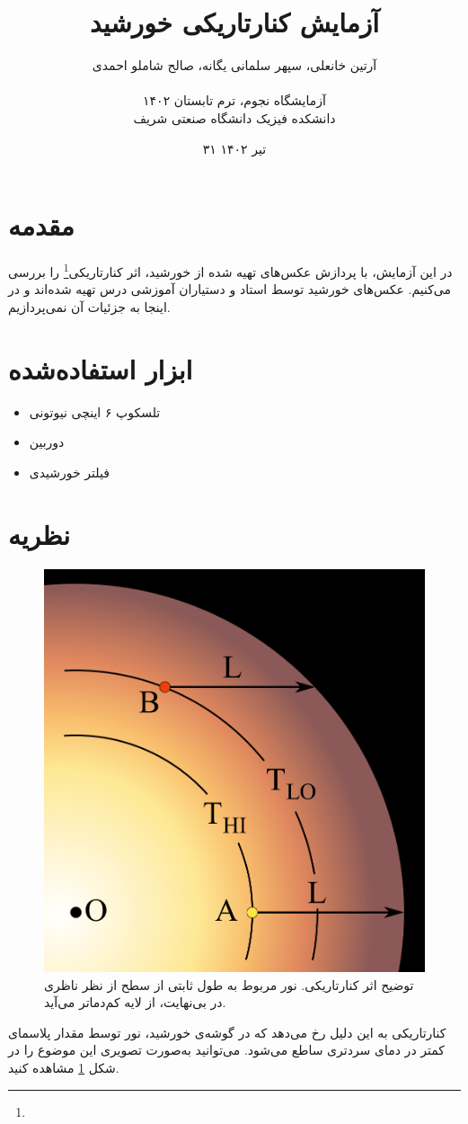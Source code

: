 \documentclass[12pt,a4paper]{article}
\title{آزمایش کنارتاریکی خورشید}
\author{آرتین خانعلی، سپهر سلمانی یگانه، صالح شاملو احمدی\\\\
	آزمایشگاه نجوم، ترم تابستان ۱۴۰۲\\دانشکده فیزیک دانشگاه صنعتی شریف}
\date{۳۱ تیر ۱۴۰۲}
\begin{document}
	\maketitle
	\twocolumnfootnotes
	\section{مقدمه}
	در این آزمایش، با پردازش عکس‌های تهیه شده از خورشید، اثر کنارتاریکی\footnote{} را بررسی می‌کنیم.
	عکس‌های خورشید توسط استاد و دستیاران آموزشی درس تهیه شده‌اند و در اینجا به جزئیات آن نمی‌پردازیم.
	\section{ابزار استفاده‌شده}
	\begin{itemize}
		\item تلسکوپ ۶ اینچی نیوتونی
		\item دوربین 
		\item فیلتر خورشیدی
	\end{itemize}
	\section{نظریه}
	\begin{figure}
		\centering
		\includegraphics[width=\linewidth]{../fig/Limb_darkening_layers.pdf}
		\caption{توضیح اثر کنارتاریکی. نور مربوط به طول ثابتی از سطح از نظر ناظری در بی‌نهایت، از لایه کم‌دماتر می‌آید.}
		\label{fig:limbdark}
	\end{figure}
	کنارتاریکی به این دلیل رخ می‌دهد که در گوشه‌ی خورشید، نور توسط مقدار پلاسمای کمتر در دمای سردتری ساطع می‌شود.
	می‌توانید به‌صورت تصویری این موضوع را در شکل \ref{fig:limbdark} مشاهده کنید.
	
\end{document}
